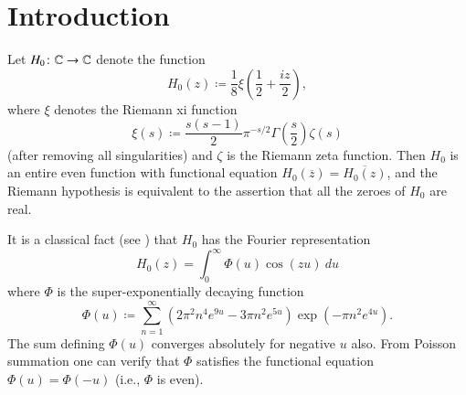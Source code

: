 \section{Introduction}

Let $H_0 \colon \mathbb{C} \to \mathbb{C}$ denote the function
\begin{equation}\label{hoz}
 H_0(z) \coloneqq \frac{1}{8} \xi\left(\frac{1}{2} + \frac{iz}{2}\right),
\end{equation}
where $\xi$ denotes the Riemann xi function
\begin{equation}\label{sas}
 \xi(s) \coloneqq \frac{s(s-1)}{2} \pi^{-s/2} \Gamma\left(\frac{s}{2}\right) \zeta(s)
\end{equation}
(after removing all singularities) and $\zeta$ is the Riemann zeta function.
Then $H_0$ is an entire even function with functional equation $H_0(\overline{z}) = \overline{H_0(z)}$, and the Riemann hypothesis is equivalent to the assertion that all the zeroes of $H_0$ are real.

It is a classical fact (see \cite[p. 255]{titch}) that $H_0$ has the Fourier representation
$$ H_0(z) = \int_0^\infty \Phi(u) \cos(zu)\ du$$
where $\Phi$ is the super-exponentially decaying function
\begin{equation}\label{phidef}
 \Phi(u) \coloneqq \sum_{n=1}^\infty (2\pi^2  n^4 e^{9u} - 3\pi n^2 e^{5u} ) \exp(-\pi n^2 e^{4u} ).
\end{equation}
The sum defining $\Phi(u)$ converges absolutely for negative $u$ also.  From Poisson summation one can verify that $\Phi$ satisfies the functional equation $\Phi(u) = \Phi(-u)$ (i.e., $\Phi$ is even). 

